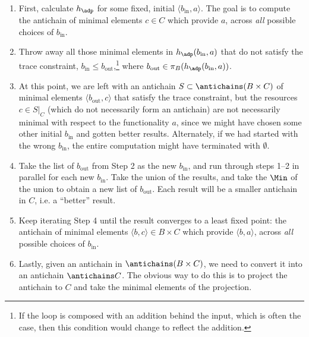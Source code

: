 \begin{enumerate}
\item First, calculate $h_\adp$ for some fixed, initial $\langle b_{\text{in}},a \rangle$. The goal is to compute the antichain of minimal elements $c \in C$ which provide $a$, across \emph{all} possible choices of $b_{\text{in}}$.
\item Throw away all those minimal elements in $h_\adp(b_{\text{in}},a)$ that do not satisfy the trace constraint, $b_{\text{in}} \leq b_{\text{out}}$,\footnote{If the loop is composed with an addition behind the input, which is often the case, then this condition would change to reflect the addition.} where $b_{\text{out}} \in \pi_B(h_\adp(b_{\text{in}},a))$.
\item At this point, we are left with an antichain $S \subset \antichains (B \times C)$ of minimal elements $\langle b_{\text{out}},c \rangle$ that satisfy the trace constraint, but the resources $c \in S|_C$ (which do not necessarily form an antichain) are not necessarily minimal with respect to the functionality $a$, since we might have chosen some other initial $b_{\text{in}}$ and gotten better results. Alternately, if we had started with the wrong $b_{\text{in}}$, the entire computation might have terminated with $\emptyset$.
\item Take the list of $b_{\text{out}}$ from Step 2 as the new $b_{\text{in}}$, and run through steps 1--2 in parallel for each new $b_{\text{in}}$. Take the union of the results, and take the $\Min$ of the union to obtain a new list of $b_{\text{out}}$. Each result will be a smaller antichain in $C$, i.e. a ``better'' result.
\item Keep iterating Step 4 until the result converges to a least fixed point: the antichain of minimal elements $\langle b, c \rangle \in B \times C$ which provide $\langle b, a \rangle$, across \emph{all} possible choices of $b_{\text{in}}$.
\item Lastly, given an antichain in $\antichains (B\times C)$, we need to convert it into an antichain $\antichains C$. The obvious way to do this is to project the antichain to $C$ and take the minimal elements of the projection.


\end{enumerate}

